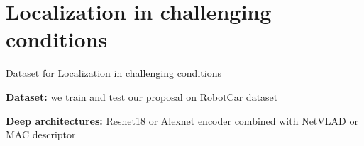 \section{Localization in challenging conditions}

\label{sec:results}

\begin{frame}{Dataset for Localization in challenging conditions}
	
	\textcolor{mLightBrown}{\textbf{Dataset:}} we train and test our proposal on RobotCar dataset
	
	\textcolor{mLightBrown}{\textbf{Deep architectures:}} Resnet18 or Alexnet encoder combined with NetVLAD or MAC descriptor

	\vfill
	
	
	\vfill
	
\end{frame}

%	
%		

